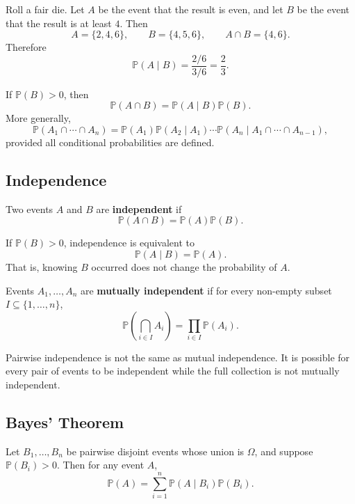 \begin{example}
Roll a fair die. Let $A$ be the event that the result is even, and let $B$ be the event that the result is at least $4$. Then
\[
    A=\{2,4,6\},\qquad B=\{4,5,6\},\qquad A\cap B=\{4,6\}.
\]
Therefore
\[
    \mathbb{P}(A\mid B)=\frac{2/6}{3/6}=\frac23.
\]
\end{example}

\begin{proposition}
If $\mathbb{P}(B)>0$, then
\[
    \mathbb{P}(A\cap B)=\mathbb{P}(A\mid B)\mathbb{P}(B).
\]
More generally,
\[
    \mathbb{P}(A_1\cap\cdots\cap A_n)
    =\mathbb{P}(A_1)\mathbb{P}(A_2\mid A_1)\cdots\mathbb{P}(A_n\mid A_1\cap\cdots\cap A_{n-1}),
\]
provided all conditional probabilities are defined.
\end{proposition}

\subsection{Independence}

\begin{definition}
Two events $A$ and $B$ are \textbf{independent} if
\[
    \mathbb{P}(A\cap B)=\mathbb{P}(A)\mathbb{P}(B).
\]
\end{definition}

If $\mathbb{P}(B)>0$, independence is equivalent to
\[
    \mathbb{P}(A\mid B)=\mathbb{P}(A).
\]
That is, knowing $B$ occurred does not change the probability of $A$.

\begin{definition}
Events $A_1,\dots,A_n$ are \textbf{mutually independent} if for every non-empty subset $I\subseteq\{1,\dots,n\}$,
\[
    \mathbb{P}\left(\bigcap_{i\in I}A_i\right)=\prod_{i\in I}\mathbb{P}(A_i).
\]
\end{definition}

\begin{remark}
Pairwise independence is not the same as mutual independence. It is possible for every pair of events to be independent while the full collection is not mutually independent.
\end{remark}

\subsection{Bayes' Theorem}

\begin{theorem}
Let $B_1,\dots,B_n$ be pairwise disjoint events whose union is $\Omega$, and suppose $\mathbb{P}(B_i)>0$. Then for any event $A$,
\[
    \mathbb{P}(A)=\sum_{i=1}^{n}\mathbb{P}(A\mid B_i)\mathbb{P}(B_i).
\]
\end{theorem}

